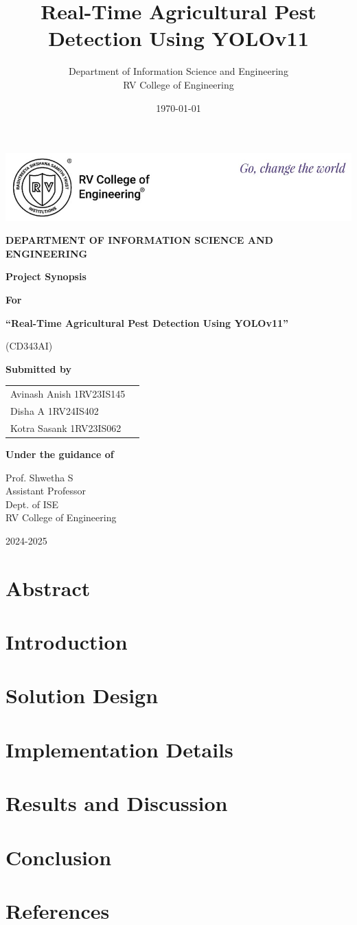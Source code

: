 \documentclass[12pt]{report}
\title{\fontsize{16}{19}\selectfont Real-Time Agricultural Pest Detection Using YOLOv11}
\author{Department of Information Science and Engineering\\
        RV College of Engineering}
\date{\today}
\renewcommand{\normalsize}{\fontsize{12}{14}\selectfont}
\renewcommand{\maketitle}{
    \begin{titlepage}
        \centering
        \vspace*{-2cm}
        
        \begin{center}
            \includegraphics[width=1.025\textwidth]{images/rvce_logo_header.jpg}\par
        \end{center}
        \vspace{0.5cm}
        
        {\Large\bfseries DEPARTMENT OF INFORMATION SCIENCE AND ENGINEERING\par}
        \vspace{0.7cm}

        {\Large\bfseries Project Synopsis\par}
        \vspace{1cm} %
        {\large\bfseries For\par}
        \vspace{0.5cm} %
        {\large\bfseries ``Real-Time Agricultural Pest Detection Using YOLOv11''\par}
        \vspace{0.2cm} %
        {\normalsize (CD343AI)\par}
        \vspace{1cm} %
        
        {\large\bfseries Submitted by\par}
        \vspace{0.3cm}
        \begin{tabular}{ll}
            Avinash Anish 1RV23IS145  \\ 
            \hspace{0.35cm} Disha A 1RV24IS402 \\
            Kotra Sasank 1RV23IS062 \\
        \end{tabular}
        \vspace{1cm}
        
        {\large\bfseries Under the guidance of\par}
        \vspace{0.2cm}
        Prof. Shwetha S \\
        Assistant Professor\\
        Dept. of ISE\\
        RV College of Engineering\\
        \vfill
        
        {\large 2024-2025}
    \end{titlepage}
}
\begin{document}
\maketitle

\newpage









\chapter{Abstract}
\thispagestyle{empty}


\tableofcontents
\thispagestyle{empty}

\newpage

\chapter{Introduction}


\chapter{Solution Design}


\chapter{Implementation Details}


\chapter{Results and Discussion}


\chapter{Conclusion}


\chapter*{References}

\end{document}
